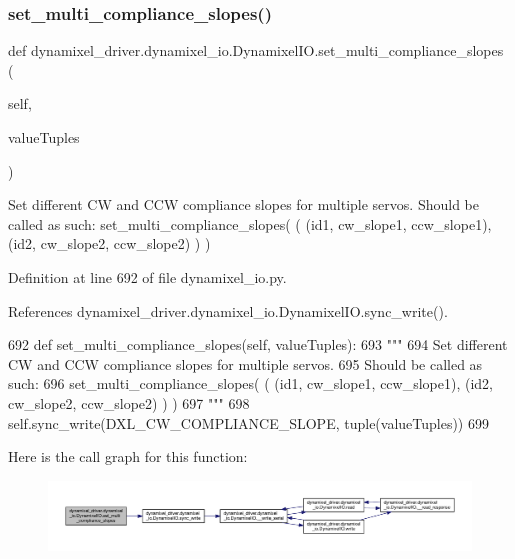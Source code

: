 \subsubsection{\texorpdfstring{set\+\_\+multi\+\_\+compliance\+\_\+slopes()}{set\_multi\_compliance\_slopes()}}
{\footnotesize\ttfamily def dynamixel\+\_\+driver.\+dynamixel\+\_\+io.\+Dynamixel\+I\+O.\+set\+\_\+multi\+\_\+compliance\+\_\+slopes (\begin{DoxyParamCaption}\item[{}]{self,  }\item[{}]{value\+Tuples }\end{DoxyParamCaption})}

\begin{DoxyVerb}Set different CW and CCW compliance slopes for multiple servos.
Should be called as such:
set_multi_compliance_slopes( ( (id1, cw_slope1, ccw_slope1), (id2, cw_slope2, ccw_slope2) ) )
\end{DoxyVerb}
 

Definition at line 692 of file dynamixel\+\_\+io.\+py.



References dynamixel\+\_\+driver.\+dynamixel\+\_\+io.\+Dynamixel\+I\+O.\+sync\+\_\+write().


\begin{DoxyCode}
692     \textcolor{keyword}{def }set\_multi\_compliance\_slopes(self, valueTuples):
693         \textcolor{stringliteral}{"""}
694 \textcolor{stringliteral}{        Set different CW and CCW compliance slopes for multiple servos.}
695 \textcolor{stringliteral}{        Should be called as such:}
696 \textcolor{stringliteral}{        set\_multi\_compliance\_slopes( ( (id1, cw\_slope1, ccw\_slope1), (id2, cw\_slope2, ccw\_slope2) ) )}
697 \textcolor{stringliteral}{        """}
698         self.sync\_write(DXL\_CW\_COMPLIANCE\_SLOPE, tuple(valueTuples))
699 
\end{DoxyCode}
Here is the call graph for this function\+:
\nopagebreak
\begin{figure}[H]
\begin{center}
\leavevmode
\includegraphics[width=350pt]{dd/d77/classdynamixel__driver_1_1dynamixel__io_1_1_dynamixel_i_o_af3b2a4bd581266a9dd067a0c1f34687a_cgraph}
\end{center}
\end{figure}
\mbox{\label{classdynamixel__driver_1_1dynamixel__io_1_1_dynamixel_i_o_aca2d90dab958dcc6d058c1eb6d7a6e11}} 
